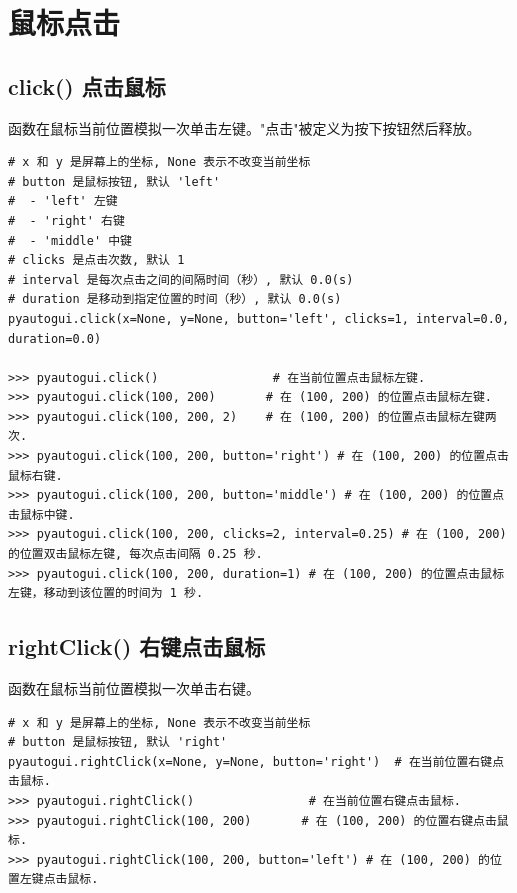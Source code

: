 \section{鼠标点击}
\subsection{click() 点击鼠标}
 函数在鼠标当前位置模拟一次单击左键。"点击"被定义为按下按钮然后释放。

\begin{lstlisting}[style=demostyle,numbers=none]
# x 和 y 是屏幕上的坐标, None 表示不改变当前坐标
# button 是鼠标按钮, 默认 'left'
#  - 'left' 左键
#  - 'right' 右键
#  - 'middle' 中键
# clicks 是点击次数, 默认 1
# interval 是每次点击之间的间隔时间（秒）, 默认 0.0(s)
# duration 是移动到指定位置的时间（秒）, 默认 0.0(s)
pyautogui.click(x=None, y=None, button='left', clicks=1, interval=0.0, duration=0.0)

>>> pyautogui.click()                # 在当前位置点击鼠标左键.
>>> pyautogui.click(100, 200)       # 在 (100, 200) 的位置点击鼠标左键.
>>> pyautogui.click(100, 200, 2)    # 在 (100, 200) 的位置点击鼠标左键两次.
>>> pyautogui.click(100, 200, button='right') # 在 (100, 200) 的位置点击鼠标右键.
>>> pyautogui.click(100, 200, button='middle') # 在 (100, 200) 的位置点击鼠标中键.
>>> pyautogui.click(100, 200, clicks=2, interval=0.25) # 在 (100, 200) 的位置双击鼠标左键, 每次点击间隔 0.25 秒.
>>> pyautogui.click(100, 200, duration=1) # 在 (100, 200) 的位置点击鼠标左键，移动到该位置的时间为 1 秒.
\end{lstlisting}

\subsection{rightClick() 右键点击鼠标}
 函数在鼠标当前位置模拟一次单击右键。
\begin{lstlisting}[style=demostyle,numbers=none]
# x 和 y 是屏幕上的坐标, None 表示不改变当前坐标
# button 是鼠标按钮, 默认 'right'
pyautogui.rightClick(x=None, y=None, button='right')  # 在当前位置右键点击鼠标.
>>> pyautogui.rightClick()                # 在当前位置右键点击鼠标.
>>> pyautogui.rightClick(100, 200)       # 在 (100, 200) 的位置右键点击鼠标.
>>> pyautogui.rightClick(100, 200, button='left') # 在 (100, 200) 的位置左键点击鼠标.
\end{lstlisting}

